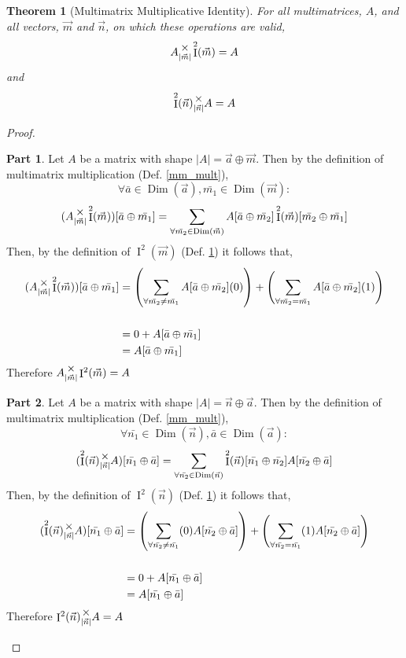 \documentclass[12pt]{book}
\theoremstyle{plain}
\newtheorem{theorem}{Theorem}[chapter]
\theoremstyle{definition}
\theoremstyle{ppart}
\newtheorem{ppart}{Part}
\theoremstyle{case}
\theoremstyle{solution}
\DeclareMathOperator{\Dim}{Dim}
\DeclareMathOperator{\Ident}{I}
\newcommand{\mmult}[1]{\text{\raisebox{1ex}{$\underset{#1}{\times}$}}}
\newcommand{\shape}[1]{\left|#1\right|}
\begin{document}
\begin{theorem}[Multimatrix Multiplicative Identity]
\label{mm_ident}
For all multimatrices, $A$, and all vectors, $\vec{m}$ and $\vec{n}$,  on which
these operations are valid,
\[
 A \mmult{\shape{\vec{m}}} \Ident^2(\vec{m}) = A
\]
and
\[
 \Ident^2(\vec{n}) \mmult{\shape{\vec{n}}} A = A
\]
\end{theorem}
\begin{proof}
\begin{ppart}
Let $A$ be a matrix with shape $\shape{A} = \vec{a} \oplus \vec{m}$.
Then by the definition of multimatrix multiplication (Def. \ref{mm_mult}),
\[ \forall \bar{a} \in \Dim(\vec{a}), \bar{m_1} \in \Dim(\vec{m}) : \]
\[
 (A \mmult{\shape{\vec{m}}} \Ident^2(\vec{m}))[\bar{a} \oplus \bar{m_1}]
 =
 \sum_{\forall \bar{m_2} \in \Dim(\vec{m})}
 A[\bar{a} \oplus \bar{m_2}] \Ident^2(\vec{m})[\bar{m_2} \oplus \bar{m_1}]
\]
Then, by the definition of $\Ident^2(\vec{m})$ (Def. \ref{mm_ident}) it follows
that,
\begin{align*}
 (A \mmult{\shape{\vec{m}}} \Ident^2(\vec{m}))[\bar{a} \oplus \bar{m_1}]
 &=
 \left(
  \sum_{\forall \bar{m_2} \ne \bar{m_1}}
  A[\bar{a} \oplus \bar{m_2}] (0)
 \right)
 +
 \left(
  \sum_{\forall \bar{m_2} = \bar{m_1}}
  A[\bar{a} \oplus \bar{m_2}] (1)
 \right) \\
 \\
 &= 0 + A[\bar{a} \oplus \bar{m_1}] \\
 &= A[\bar{a} \oplus \bar{m_1}]
\end{align*}
Therefore $A \mmult{\shape{\vec{m}}} \Ident^2(\vec{m}) = A$
\end{ppart}
\begin{ppart}
Let $A$ be a matrix with shape $\shape{A} = \vec{n} \oplus \vec{a}$.
Then by the definition of multimatrix multiplication (Def. \ref{mm_mult}),
\[ \forall  \bar{n_1} \in \Dim(\vec{n}), \bar{a} \in \Dim(\vec{a}) : \]
\[
 (\Ident^2(\vec{n}) \mmult{\shape{\vec{n}}} A)[\bar{n_1} \oplus \bar{a}]
 =
 \sum_{\forall \bar{n_2} \in \Dim(\vec{n})}
 \Ident^2(\vec{n})[\bar{n_1} \oplus \bar{n_2}]A[\bar{n_2} \oplus \bar{a}] 
\]
Then, by the definition of $\Ident^2(\vec{n})$ (Def. \ref{mm_ident}) it follows
that,
\begin{align*}
 (\Ident^2(\vec{n}) \mmult{\shape{\vec{n}}} A)[\bar{n_1} \oplus \bar{a}]
 &=
 \left(
  \sum_{\forall \bar{n_2} \ne \bar{n_1}}
  (0) A[\bar{n_2} \oplus \bar{a}]
 \right)
 +
 \left(
  \sum_{\forall \bar{n_2} = \bar{n_1}}
  (1) A[\bar{n_2} \oplus \bar{a}]
 \right) \\
 \\
 &= 0 + A[\bar{n_1} \oplus \bar{a}] \\
 &= A[\bar{n_1} \oplus \bar{a}]
\end{align*}
Therefore $\Ident^2(\vec{n}) \mmult{\shape{\vec{n}}} A = A$
\end{ppart}
\end{proof}
\end{document}
